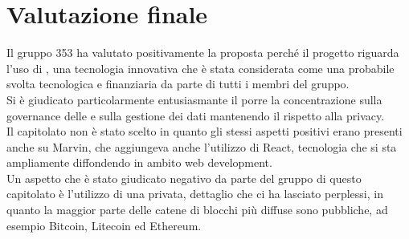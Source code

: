 \documentclass[StudioDiFattibilità.tex]{subfiles}
\begin{document}
\section{Valutazione finale}
Il gruppo 353 ha valutato positivamente la proposta perché il progetto riguarda l'uso di , una tecnologia innovativa che è stata considerata come una probabile svolta tecnologica e finanziaria da parte di tutti i membri del gruppo.\\
Si è giudicato particolarmente entusiasmante il porre la concentrazione sulla governance delle  e sulla gestione dei dati mantenendo il rispetto alla privacy.\\
Il capitolato non è stato scelto in quanto gli stessi aspetti positivi erano presenti anche su Marvin, che aggiungeva anche l'utilizzo di React, tecnologia che si sta ampliamente diffondendo in ambito web development.\\
Un aspetto che è stato giudicato negativo da parte del gruppo di questo capitolato è l'utilizzo di una  privata, dettaglio che ci ha lasciato perplessi, in quanto la maggior parte delle catene di blocchi più diffuse sono pubbliche, ad esempio Bitcoin, Litecoin ed Ethereum.
\end{document}
